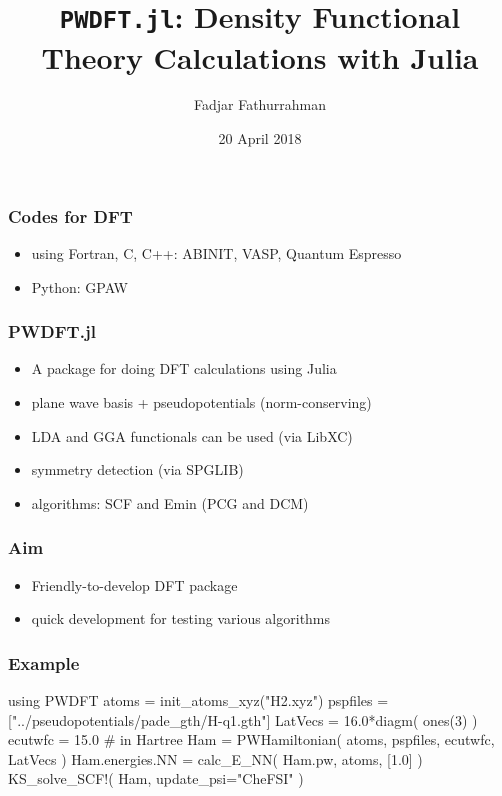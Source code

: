 \documentclass[english,10pt]{beamer}
\begin{document}
\title{\texttt{PWDFT.jl}: Density Functional Theory Calculations with Julia}
\author{Fadjar Fathurrahman}
\date{20 April 2018}

\frame{\titlepage}

\begin{frame}
\frametitle{Codes for DFT}

\begin{itemize}
\item using Fortran, C, C++: ABINIT, VASP, Quantum Espresso
\item Python: GPAW
\end{itemize}

\end{frame}


\begin{frame}
\frametitle{PWDFT.jl}

\begin{itemize}
\item A package for doing DFT calculations using Julia
\item plane wave basis + pseudopotentials (norm-conserving)
\item LDA and GGA functionals can be used (via LibXC)
\item symmetry detection (via SPGLIB)
\item algorithms: SCF and Emin (PCG and DCM)
\end{itemize}

\end{frame}


\begin{frame}
\frametitle{Aim}

\begin{itemize}
\item Friendly-to-develop DFT package
\item quick development for testing various algorithms
\end{itemize}

\end{frame}


\begin{frame}[fragile]
\frametitle{Example}

\begin{juliacode}
using PWDFT
atoms = init_atoms_xyz("H2.xyz")
pspfiles = ["../pseudopotentials/pade_gth/H-q1.gth"]
LatVecs = 16.0*diagm( ones(3) )
ecutwfc = 15.0 # in Hartree
Ham = PWHamiltonian( atoms, pspfiles, ecutwfc, LatVecs )
Ham.energies.NN = calc_E_NN( Ham.pw, atoms, [1.0] )
KS_solve_SCF!( Ham, update_psi="CheFSI" )
\end{juliacode}

\end{frame}
\end{document}
